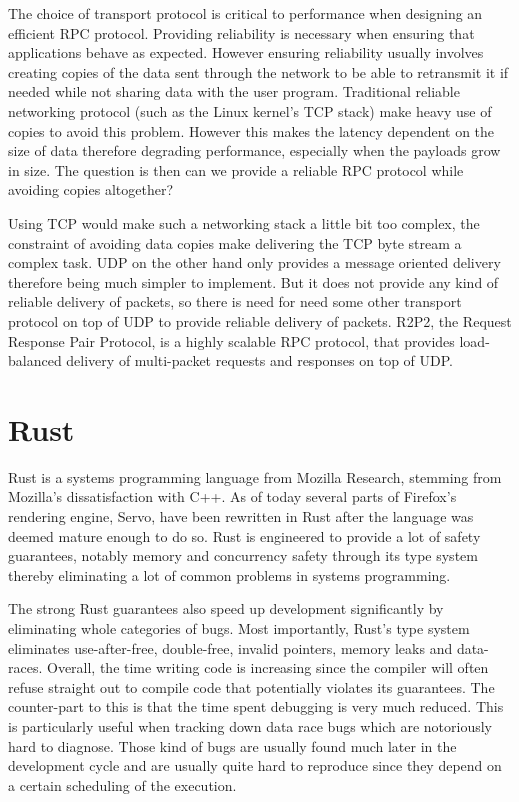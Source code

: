 The choice of transport protocol is critical to performance when
designing an efficient RPC protocol. Providing reliability is
necessary when ensuring that applications behave as expected. However
ensuring reliability usually involves creating copies of the data sent
through the network to be able to retransmit it if needed while not
sharing data with the user program. Traditional reliable networking
protocol (such as the Linux kernel's TCP stack) make heavy use of
copies to avoid this problem. However this makes the latency dependent
on the size of data therefore degrading performance, especially when
the payloads grow in size. The question is then can we provide a
reliable RPC protocol while avoiding copies altogether?

Using TCP would make such a networking stack a little bit too complex,
the constraint of avoiding data copies make delivering the TCP byte
stream a complex task. UDP on the other hand only provides a message
oriented delivery therefore being much simpler to implement. But it
does not provide any kind of reliable delivery of packets, so there is
need for need some other transport protocol on top of UDP to provide
reliable delivery of packets. R2P2, the Request Response Pair
Protocol, is a highly scalable RPC protocol, that provides
load-balanced delivery of multi-packet requests and responses on top
of UDP.

\section{Rust}

Rust is a systems programming language from Mozilla Research, stemming
from Mozilla's dissatisfaction with C++. As of today several parts of
Firefox's rendering engine, Servo, have been rewritten in Rust after
the language was deemed mature enough to do so. Rust is engineered to
provide a lot of safety guarantees, notably memory and concurrency
safety through its type system thereby eliminating a lot of common
problems in systems programming.

The strong Rust guarantees also speed up development significantly by
eliminating whole categories of bugs. Most importantly, Rust's type system
eliminates use-after-free, double-free, invalid pointers, memory leaks
and data-races. Overall, the time writing code is increasing since the
compiler will often refuse straight out to compile code that
potentially violates its guarantees. The counter-part to this is that
the time spent debugging is very much reduced. This is particularly
useful when tracking down data race bugs which are notoriously hard to
diagnose. Those kind of bugs are usually found much later in the
development cycle and are usually quite hard to reproduce since they
depend on a certain scheduling of the execution.

